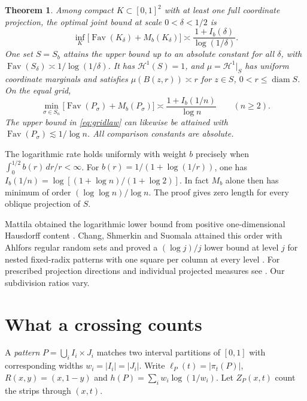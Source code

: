 \documentclass[11pt,reqno]{amsart}
\newtheorem{theorem}{Theorem}
\newcommand{\Fav}{\operatorname{Fav}}
\newcommand{\diam}{\operatorname{diam}}
\begin{document}
\begin{theorem}\label{thm:profile}
Among compact $K\subset[0,1]^2$ with at least one full coordinate projection, the optimal joint bound at scale $0<\delta<1/2$ is
\begin{equation}\label{eq:law}
 \inf_K\bigl[\Fav(K_\delta)+M_b(K_\delta)\bigr]
 \asymp \frac{1+I_b(\delta)}{\log(1/\delta)} .
\end{equation}
One set $S=S_b$ attains the upper bound up to an absolute constant for all $\delta$, with $\Fav(S_\delta)\asymp1/\log(1/\delta)$. It has $\mathcal H^1(S)=1$, and $\mu=\mathcal H^1|_S$ has uniform coordinate marginals and satisfies $\mu(B(z,r))\asymp r$ for $z\in S$, $0<r\le\diam S$. On the equal grid,
\begin{equation}\label{eq:gridlaw}
 \min_{\sigma\in S_n}\bigl[\Fav(P_\sigma)+M_b(P_\sigma)\bigr]
 \asymp \frac{1+I_b(1/n)}{\log n}\qquad(n\ge2).
\end{equation}
The upper bound in \eqref{eq:gridlaw} can likewise be attained with $\Fav(P_\sigma)\lesssim1/\log n$. All comparison constants are absolute.
\end{theorem}

The logarithmic rate holds uniformly with weight $b$ precisely when $\int_0^{1/2}b(r)\,dr/r<\infty$. For $b(r)=1/(1+\log(1/r))$, one has $I_b(1/n)=\log[(1+\log n)/(1+\log2)]$. In fact $M_b$ alone then has minimum of order $(\log\log n)/\log n$. The proof gives zero length for every oblique projection of $S$.

Mattila obtained the logarithmic lower bound from positive one-dimensional Hausdorff content \cite{Mattila,CSS}. Chang, Shmerkin and Suomala attained this order with Ahlfors regular random sets and proved a $(\log j)/j$ lower bound at level $j$ for nested fixed-radix patterns with one square per column at every level \cite[Theorem~A.1]{CSS}. For prescribed projection directions and individual projected measures see \cite{Visibility,CS}. Our subdivision ratios vary.

\section{What a crossing counts}\label{sec:cross}

A \emph{pattern} $P=\bigcup_i I_i\times J_i$ matches two interval partitions of $[0,1]$ with corresponding widths $w_i=|I_i|=|J_i|$. Write $\ell_P(t)=|\pi_t(P)|$, $R(x,y)=(x,1-y)$ and $h(P)=\sum_i w_i\log(1/w_i)$. Let $Z_P(x,t)$ count the strips through $(x,t)$.
\end{document}
